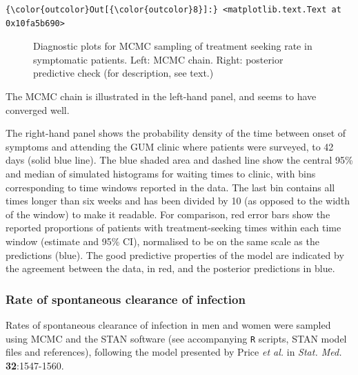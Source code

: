 \documentclass{article}
\begin{document}
    \begin{footnotesize}
            \begin{Verbatim}[commandchars=\\\{\}]
{\color{outcolor}Out[{\color{outcolor}8}]:} <matplotlib.text.Text at 0x10fa5b690>
\end{Verbatim}
    \end{footnotesize}
        
    \begin{figure}
        \begin{center}\end{center}
        \caption{Diagnostic plots for MCMC sampling of treatment seeking rate in symptomatic patients. Left: MCMC chain. Right: posterior predictive check (for description, see text.)}
        \label{fig:trt_seek_diagnostic}
    \end{figure}
    
    The MCMC chain is illustrated in the left-hand panel, and seems to have
converged well.

The right-hand panel shows the probability density of the time between
onset of symptoms and attending the GUM clinic where patients were
surveyed, to 42 days (solid blue line). The blue shaded area and dashed
line show the central 95\% and median of simulated histograms for
waiting times to clinic, with bins corresponding to time windows
reported in the data. The last bin contains all times longer than six
weeks and has been divided by 10 (as opposed to the width of the window)
to make it readable. For comparison, red error bars show the reported
proportions of patients with treatment-seeking times within each time
window (estimate and 95\% CI), normalised to be on the same scale as the
predictions (blue). The good predictive properties of the model are
indicated by the agreement between the data, in red, and the posterior
predictions in blue.

    \subsubsection{Rate of spontaneous clearance of
infection}\label{rate-of-spontaneous-clearance-of-infection}

Rates of spontaneous clearance of infection in men and women were
sampled using MCMC and the STAN software (see accompanying \texttt{R}
scripts, STAN model files and references), following the model presented
by Price \emph{et al.} in \emph{Stat. Med.} \textbf{32}:1547-1560.
\end{document}
